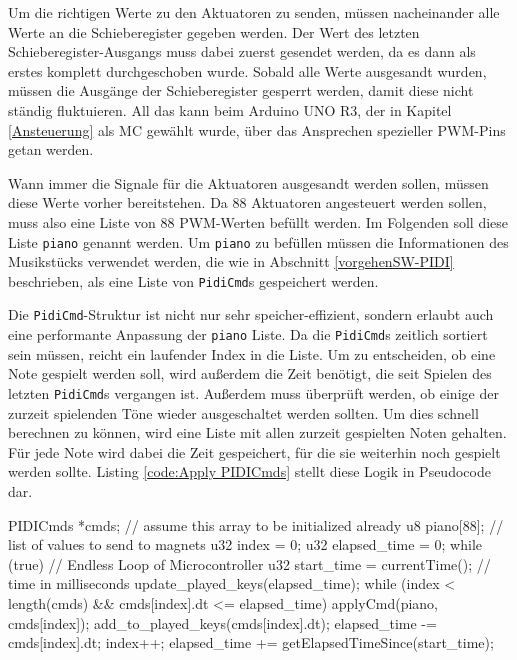 Um die richtigen Werte zu den Aktuatoren zu senden, müssen nacheinander alle Werte an die Schieberegister gegeben werden.
Der Wert des letzten Schieberegister-Ausgangs muss dabei zuerst gesendet werden, da es dann als erstes komplett durchgeschoben wurde.
Sobald alle Werte ausgesandt wurden, müssen die Ausgänge der Schieberegister gesperrt werden, damit diese nicht ständig fluktuieren.
All das kann beim Arduino UNO R3, der in Kapitel \ref{Ansteuerung} als \ac{MC} gewählt wurde, über das Ansprechen spezieller \ac{PWM}-Pins getan werden.

Wann immer die Signale für die Aktuatoren ausgesandt werden sollen, müssen diese Werte vorher bereitstehen.
Da 88 Aktuatoren angesteuert werden sollen, muss also eine Liste von 88 \ac{PWM}-Werten befüllt werden.
Im Folgenden soll diese Liste \lstinline{piano} genannt werden.
Um \lstinline{piano} zu befüllen müssen die Informationen des Musikstücks verwendet werden, die wie in Abschnitt \ref{vorgehenSW-PIDI} beschrieben, als eine Liste von \lstinline{PidiCmd}s gespeichert werden.

Die \lstinline{PidiCmd}-Struktur ist nicht nur sehr speicher-effizient, sondern erlaubt auch eine performante Anpassung der \lstinline{piano} Liste.
Da die \lstinline{PidiCmd}s zeitlich sortiert sein müssen, reicht ein laufender Index in die Liste.
Um zu entscheiden, ob eine Note gespielt werden soll, wird außerdem die Zeit benötigt, die seit Spielen des letzten \lstinline{PidiCmd}s vergangen ist.
Außerdem muss überprüft werden, ob einige der zurzeit spielenden Töne wieder ausgeschaltet werden sollten.
Um dies schnell berechnen zu können, wird eine Liste mit allen zurzeit gespielten Noten gehalten.
Für jede Note wird dabei die Zeit gespeichert, für die sie weiterhin noch gespielt werden sollte.
Listing \ref{code:Apply PIDICmds} stellt diese Logik in Pseudocode dar.

\begin{UnbrokenCodePage}[style=CStyle, caption={Nutzung der \lstinline{PidiCmd}-Struktur}, label={code:Apply PIDICmds}]
PIDICmds *cmds; // assume this array to be initialized already
u8  piano[88];  // list of values to send to magnets
u32 index = 0;
u32 elapsed_time = 0;
while (true) {  // Endless Loop of Microcontroller
    u32 start_time   = currentTime(); // time in milliseconds
    update_played_keys(elapsed_time);
    while (index < length(cmds) && cmds[index].dt <= elapsed_time) {
        applyCmd(piano, cmds[index]);
        add_to_played_keys(cmds[index].dt);
        elapsed_time -= cmds[index].dt;
        index++;
    }
    elapsed_time += getElapsedTimeSince(start_time);
}
\end{UnbrokenCodePage}

